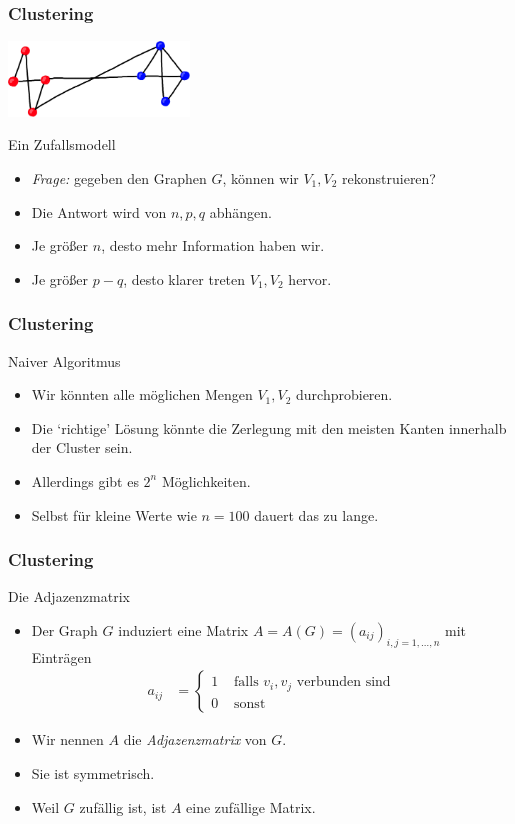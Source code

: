 \documentclass{beamer}
\renewcommand{\emph}[1]{{\textcolor{solarizedRed}{\itshape #1}}}
\renewcommand{\ae}{\"a}
\renewcommand{\oe}{\"o}
\newcommand{\ue}{\"u}
\newcommand{\mytitle}{Clustering}
\begin{document}
\begin{frame}\frametitle{\mytitle}
	\hfill\includegraphics[height=20mm]{pics/sbm.pdf}
	\begin{block}{Ein Zufallsmodell}
		\begin{itemize}
			\item \emph{Frage:} gegeben den Graphen $G$, k\oe nnen wir $V_1,V_2$ rekonstruieren?
			\item Die Antwort wird von $n,p,q$ abh\ae ngen.
			\item Je gr\oe\ss er $n$, desto mehr Information haben wir.
			\item Je gr\oe\ss er $p-q$, desto klarer treten $V_1,V_2$ hervor.
		\end{itemize}
	\end{block}
\end{frame}

\begin{frame}\frametitle{\mytitle}
	\begin{block}{Naiver Algoritmus}
		\begin{itemize}
			\item Wir k\oe nnten alle m\oe glichen Mengen $V_1,V_2$ durchprobieren.
			\item Die `richtige' L\oe sung k\oe nnte die Zerlegung mit den meisten Kanten innerhalb der Cluster sein.
			\item Allerdings gibt es $2^n$ M\oe glichkeiten.
			\item Selbst f\ue r kleine Werte wie $n=100$ dauert das zu lange.
		\end{itemize}
	\end{block}
\end{frame}

\begin{frame}\frametitle{\mytitle}
	\begin{block}{Die Adjazenzmatrix}
		\begin{itemize}
			\item Der Graph $G$ induziert eine Matrix $A=A(G)=(a_{ij})_{i,j=1,\ldots,n}$ mit Eintr\ae gen
				\begin{align*}
					a_{ij}&=\begin{cases}1&\mbox{ falls }v_i,v_j\mbox{ verbunden sind}\\0&\mbox{ sonst}\end{cases}
				\end{align*}
			\item Wir nennen $A$ die \emph{Adjazenzmatrix} von $G$.
			\item Sie ist symmetrisch.
			\item Weil $G$ zuf\ae llig ist, ist $A$ eine zuf\ae llige Matrix.
		\end{itemize}
	\end{block}
\end{frame}
\end{document}
